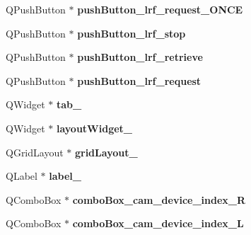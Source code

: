 \begin{DoxyCompactItemize}
\item 
\hypertarget{class_ui___main_window_a5aaa4a7aebd23f957bba2ba79b581839}{}Q\+Push\+Button $\ast$ {\bfseries push\+Button\+\_\+lrf\+\_\+request\+\_\+\+O\+N\+C\+E}\label{class_ui___main_window_a5aaa4a7aebd23f957bba2ba79b581839}

\item 
\hypertarget{class_ui___main_window_aec4a1b9f3a28cdaf5a58c9e2da46bd9a}{}Q\+Push\+Button $\ast$ {\bfseries push\+Button\+\_\+lrf\+\_\+stop}\label{class_ui___main_window_aec4a1b9f3a28cdaf5a58c9e2da46bd9a}

\item 
\hypertarget{class_ui___main_window_aa9f87a074a15b824af87132c5fa8e640}{}Q\+Push\+Button $\ast$ {\bfseries push\+Button\+\_\+lrf\+\_\+retrieve}\label{class_ui___main_window_aa9f87a074a15b824af87132c5fa8e640}

\item 
\hypertarget{class_ui___main_window_a738324b6c2ace1b7534ff0da28bc3eff}{}Q\+Push\+Button $\ast$ {\bfseries push\+Button\+\_\+lrf\+\_\+request}\label{class_ui___main_window_a738324b6c2ace1b7534ff0da28bc3eff}

\item 
\hypertarget{class_ui___main_window_a83495b23cbc6810f81978dc0d584b810}{}Q\+Widget $\ast$ {\bfseries tab\+\_}\label{class_ui___main_window_a83495b23cbc6810f81978dc0d584b810}

\item 
\hypertarget{class_ui___main_window_a873441ec9cec68e0d4eacee271765553}{}Q\+Widget $\ast$ {\bfseries layout\+Widget\+\_}\label{class_ui___main_window_a873441ec9cec68e0d4eacee271765553}

\item 
\hypertarget{class_ui___main_window_a8731b71c513ff94baf59614807823c5d}{}Q\+Grid\+Layout $\ast$ {\bfseries grid\+Layout\+\_}\label{class_ui___main_window_a8731b71c513ff94baf59614807823c5d}

\item 
\hypertarget{class_ui___main_window_a13936e6f18b1c90402b3c7a3c92b6cdb}{}Q\+Label $\ast$ {\bfseries label\+\_}\label{class_ui___main_window_a13936e6f18b1c90402b3c7a3c92b6cdb}

\item 
\hypertarget{class_ui___main_window_ac4807cadb1f6e308826f513a4b0ec292}{}Q\+Combo\+Box $\ast$ {\bfseries combo\+Box\+\_\+cam\+\_\+device\+\_\+index\+\_\+\+R}\label{class_ui___main_window_ac4807cadb1f6e308826f513a4b0ec292}

\item 
\hypertarget{class_ui___main_window_a9665eedf3f4d4e253d92e1dc0581bcd7}{}Q\+Combo\+Box $\ast$ {\bfseries combo\+Box\+\_\+cam\+\_\+device\+\_\+index\+\_\+\+L}\label{class_ui___main_window_a9665eedf3f4d4e253d92e1dc0581bcd7}


\end{DoxyCompactItemize}
